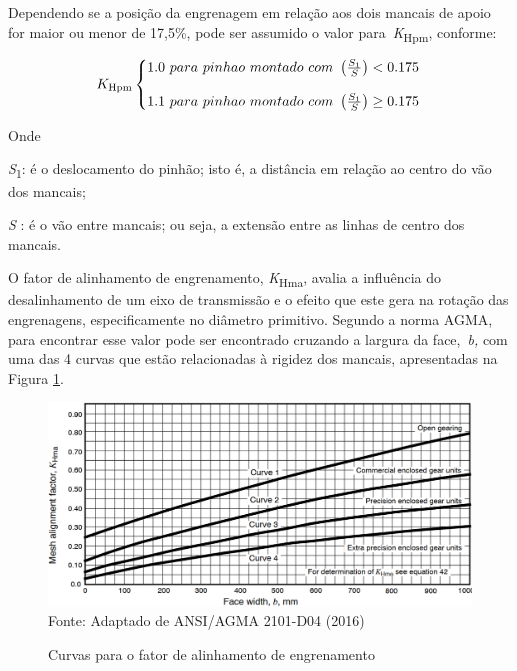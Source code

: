 \documentclass[12pt,a4paper]{article}
\begin{document}
Dependendo se a posição da engrenagem em relação aos dois mancais de
apoio for maior ou menor de 17,5\%, pode ser assumido o valor
para~\emph{K}\textsubscript{Hpm}, conforme:

\begin{equation}
K_{\text{Hpm}}\left\{\begin{matrix}1.0\ para\ pinhao\ montado\ com\ \left(\frac{S_{1}}{S}\right)<0.175\\\\
1.1\ para\ pinhao\ montado\ com\ \left(\frac{S_{1}}{S}\right)\geq 0.175\\
\end{matrix}\right.\ \nonumber \\
 \end{equation}

Onde

\emph{S}\textsubscript{1}: é o deslocamento do pinhão; isto é, a
distância em relação ao centro do vão dos mancais;

\emph{S} : é o vão entre mancais; ou seja, a extensão entre as linhas de
centro dos mancais.

O fator de alinhamento de engrenamento, \emph{K}\textsubscript{Hma},
avalia a influência do desalinhamento de um eixo de transmissão e o
efeito que este gera na rotação das engrenagens, especificamente no
diâmetro primitivo. Segundo a norma AGMA, para encontrar esse valor pode
ser encontrado cruzando a largura da face,~\emph{b,} com uma das 4
curvas que estão relacionadas à rigidez dos mancais, apresentadas na
Figura {\ref{fig:12}}.

\begin{figure}[!htb]
    \centering
    \caption{Curvas para o fator de alinhamento de engrenamento}
    \includegraphics[scale=0.47]{Imagens/Img12.png}\\
    {\footnotesize Fonte: Adaptado de ANSI/AGMA 2101-D04 (2016)}
    \label{fig:12}
\end{figure}
\end{document}
